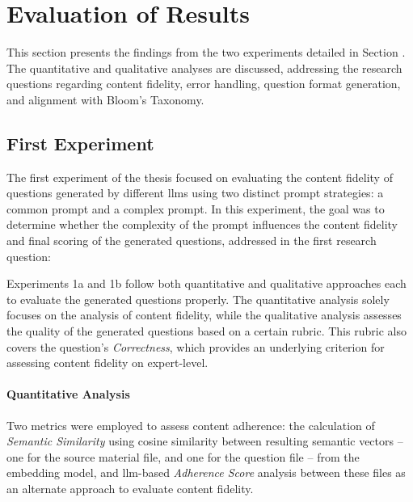 \section{Evaluation of Results} \label{sec:evaluation}

This section presents the findings from the two experiments detailed in Section . The quantitative and qualitative analyses are discussed, addressing the research questions regarding content fidelity, error handling, question format generation, and alignment with Bloom's Taxonomy.


\subsection{First Experiment}
\label{sec:first-experiment}

The first experiment of the thesis focused on evaluating the content fidelity of questions generated by different \ac{llms} using two distinct prompt strategies: a common prompt and a complex prompt. In this experiment, the goal was to determine whether the complexity of the prompt influences the content fidelity and final scoring of the generated questions, addressed in the first research question:

 Experiments 1a and 1b follow both quantitative and qualitative approaches each to evaluate the generated questions properly. The quantitative analysis solely focuses on the analysis of content fidelity, while the qualitative analysis assesses the quality of the generated questions based on a certain rubric. This rubric also covers the question's \textit{Correctness}, which provides an underlying criterion for assessing content fidelity on expert-level.

\paragraph*{Quantitative Analysis} 

Two metrics were employed to assess content adherence: the calculation of \textit{Semantic Similarity} using cosine similarity between resulting semantic vectors -- one for the source material file, and one for the question file -- from the embedding model, and \ac{llm}-based \textit{Adherence Score} analysis between these files as an alternate approach to evaluate content fidelity.

